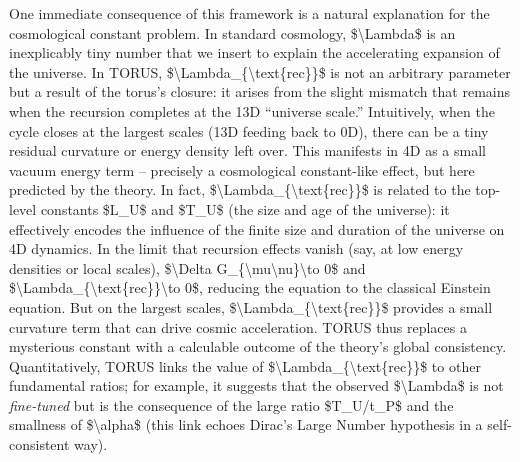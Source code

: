 \documentclass[]{article}
\begin{document}
One immediate consequence of this framework is a natural explanation for
the cosmological constant problem. In standard cosmology,
\$\textbackslash{}Lambda\$ is an inexplicably tiny number that we insert
to explain the accelerating expansion of the universe. In TORUS,
\$\textbackslash{}Lambda\_\{\textbackslash{}text\{rec\}\}\$ is not an
arbitrary parameter but a result of the torus's closure: it arises from
the slight mismatch that remains when the recursion completes at the 13D
``universe scale.'' Intuitively, when the cycle closes at the largest
scales (13D feeding back to 0D), there can be a tiny residual curvature
or energy density left over. This manifests in 4D as a small vacuum
energy term -- precisely a cosmological constant-like effect, but here
predicted by the theory. In fact,
\$\textbackslash{}Lambda\_\{\textbackslash{}text\{rec\}\}\$ is related
to the top-level constants \$L\_U\$ and \$T\_U\$ (the size and age of
the universe): it effectively encodes the influence of the finite size
and duration of the universe on 4D dynamics. In the limit that recursion
effects vanish (say, at low energy densities or local scales),
\$\textbackslash{}Delta
G\_\{\textbackslash{}mu\textbackslash{}nu\}\textbackslash{}to 0\$ and
\$\textbackslash{}Lambda\_\{\textbackslash{}text\{rec\}\}\textbackslash{}to
0\$, reducing the equation to the classical Einstein equation. But on
the largest scales,
\$\textbackslash{}Lambda\_\{\textbackslash{}text\{rec\}\}\$ provides a
small curvature term that can drive cosmic acceleration. TORUS thus
replaces a mysterious constant with a calculable outcome of the theory's
global consistency. Quantitatively, TORUS links the value of
\$\textbackslash{}Lambda\_\{\textbackslash{}text\{rec\}\}\$ to other
fundamental ratios; for example, it suggests that the observed
\$\textbackslash{}Lambda\$ is not \emph{fine-tuned} but is the
consequence of the large ratio \$T\_U/t\_P\$ and the smallness of
\$\textbackslash{}alpha\$ (this link echoes Dirac's Large Number
hypothesis in a self-consistent way).
\end{document}
